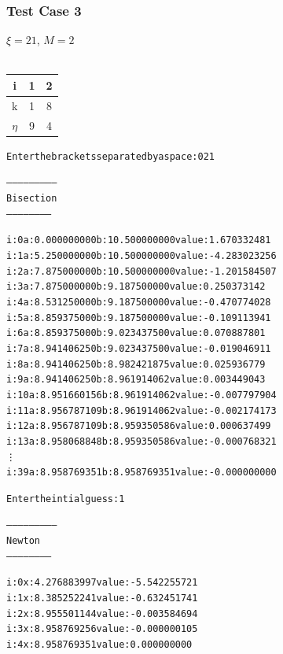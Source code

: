 \documentclass[11pt]{article} %
\begin{document}
\subsubsection*{Test Case 3}
$\xi = 21$, $M = 2$ \\ \\
\begin{tabular}{||c||c c |}
\hline
i & 1 & 2  \\
\hline
k & 1 & 8 \\
\hline
$\eta$ & 9 & 4 \\
\hline
\end{tabular}


\begin{alltt}
Enter the brackets separated by a space: 0 21

--------------------------
 Bisection
 -----------------------


i: 0	a: 0.000000000	b: 10.500000000	value: 1.670332481 
i: 1	a: 5.250000000	b: 10.500000000	value: -4.283023256 
i: 2	a: 7.875000000	b: 10.500000000	value: -1.201584507 
i: 3	a: 7.875000000	b: 9.187500000	value: 0.250373142 
i: 4	a: 8.531250000	b: 9.187500000	value: -0.470774028 
i: 5	a: 8.859375000	b: 9.187500000	value: -0.109113941 
i: 6	a: 8.859375000	b: 9.023437500	value: 0.070887801 
i: 7	a: 8.941406250	b: 9.023437500	value: -0.019046911 
i: 8	a: 8.941406250	b: 8.982421875	value: 0.025936779 
i: 9	a: 8.941406250	b: 8.961914062	value: 0.003449043 
i: 10	a: 8.951660156	b: 8.961914062	value: -0.007797904 
i: 11	a: 8.956787109	b: 8.961914062	value: -0.002174173 
i: 12	a: 8.956787109	b: 8.959350586	value: 0.000637499 
i: 13	a: 8.958068848	b: 8.959350586	value: -0.000768321 
\vdots
i: 39	a: 8.958769351	b: 8.958769351	value: -0.000000000 

Enter the intial guess: 1

--------------------------
 Newton
 -----------------------


i: 0	x: 4.276883997	value: -5.542255721
i: 1	x: 8.385252241	value: -0.632451741
i: 2	x: 8.955501144	value: -0.003584694
i: 3	x: 8.958769256	value: -0.000000105
i: 4	x: 8.958769351	value: 0.000000000
\end{alltt}
\end{document}
